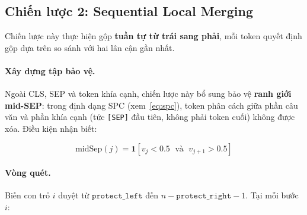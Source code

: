 \subsection{Chiến lược 2: Sequential Local Merging}
\label{subsec:sequential}

Chiến lược này thực hiện gộp \textbf{tuần tự từ trái sang phải}, mỗi
token quyết định gộp dựa trên so sánh với hai lân cận gần nhất.

\paragraph{Xây dựng tập bảo vệ.}
Ngoài CLS, SEP và token khía cạnh, chiến lược này bổ sung bảo vệ
\textbf{ranh giới mid-SEP}: trong định dạng SPC
(xem~\eqref{eq:spc}), token phân cách giữa phần câu văn và phần
khía cạnh (tức \texttt{[SEP]} đầu tiên, không phải token cuối) không
được xóa.  Điều kiện nhận biết:

\begin{equation}
  \mathrm{midSep}(j) = \mathbf{1}\!\left[
    v_j < 0.5 \;\text{ và }\; v_{j+1} > 0.5
  \right]
  \label{eq:midsep}
\end{equation}

\paragraph{Vòng quét.}
Biến con trỏ $i$ duyệt từ $\texttt{protect\_left}$ đến $n -
\texttt{protect\_right} - 1$.  Tại mỗi bước $i$:

